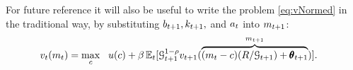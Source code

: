 For future reference it will also be useful to write the problem \eqref{eq:vNormed} in the traditional way, by substituting ${b}_{t+1},{k}_{t+1},$ and ${a}_{t}$ into ${m}_{t+1}$:
\begin{equation}\begin{gathered}\begin{aligned}
      v_{t}({m}_{t}) & = \max_{c} ~~ u(c)+ \beta \operatorname{\mathbb{E}}_{t}[ \mathcal{G}_{t+1}^{1-\rho}v_{t+1}(\overbrace{({m}_{t}-c)(R/\mathcal{G}_{t+1})+\pmb{\theta}_{t+1}}^{m_{t+1}})] \label{eq:vusual}.
    \end{aligned}\end{gathered}\end{equation}

